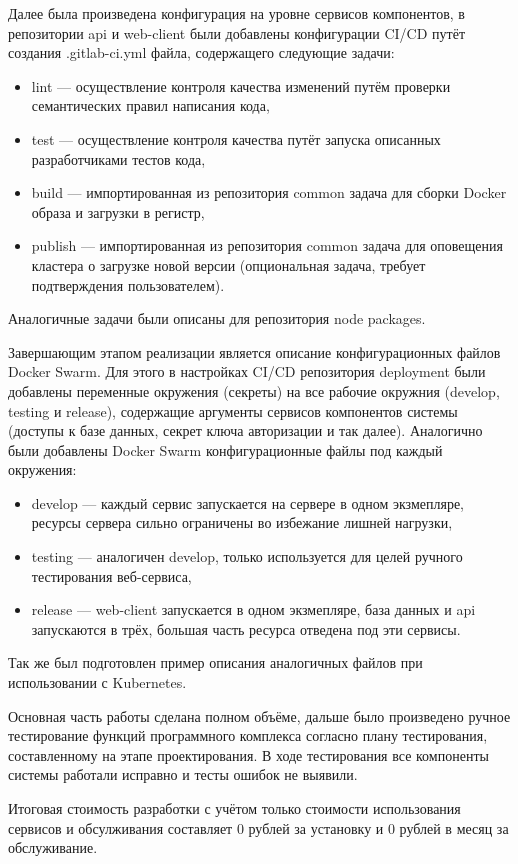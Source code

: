 Далее была произведена конфигурация на уровне сервисов компонентов, в репозитории api и web-client были добавлены конфигурации CI/CD путёт создания .gitlab-ci.yml файла, содержащего следующие задачи:
\begin{itemize}
    \item lint --- осуществление контроля качества изменений путём проверки семантических правил написания кода,
    \item test --- осуществление контроля качества путёт запуска описанных разработчиками тестов кода,
    \item build --- импортированная из репозитория common задача для сборки Docker образа и загрузки в регистр,
    \item publish --- импортированная из репозитория common задача для оповещения кластера о загрузке новой версии (опциональная задача, требует подтверждения пользователем).
\end{itemize}

Аналогичные задачи были описаны для репозитория node packages.

Завершающим этапом реализации является описание конфигурационных файлов Docker Swarm.
Для этого в настройках CI/CD репозитория deployment были добавлены переменные окружения (секреты) на все рабочие окружния (develop, testing и release),
содержащие аргументы сервисов компонентов системы (доступы к базе данных, секрет ключа авторизации и так далее).
Аналогично были добавлены Docker Swarm конфигурационные файлы под каждый окружения:

\begin{itemize}
    \item develop --- каждый сервис запускается на сервере в одном экзмепляре, ресурсы сервера сильно ограничены во избежание лишней нагрузки,
    \item testing --- аналогичен develop, только используется для целей ручного тестирования веб-сервиса,
    \item release --- web-client запускается в одном экзмепляре, база данных и api запускаются в трёх, большая часть ресурса отведена под эти сервисы.
\end{itemize}

Так же был подготовлен пример описания аналогичных файлов при использовании с Kubernetes.

Основная часть работы сделана полном объёме, дальше было произведено ручное тестирование функций программного комплекса согласно плану тестирования, составленному на этапе проектирования.
В ходе тестирования все компоненты системы работали исправно и тесты ошибок не выявили.

Итоговая стоимость разработки с учётом только стоимости использования сервисов и обсулживания составляет 0 рублей за установку и 0 рублей в месяц за обслуживание.


